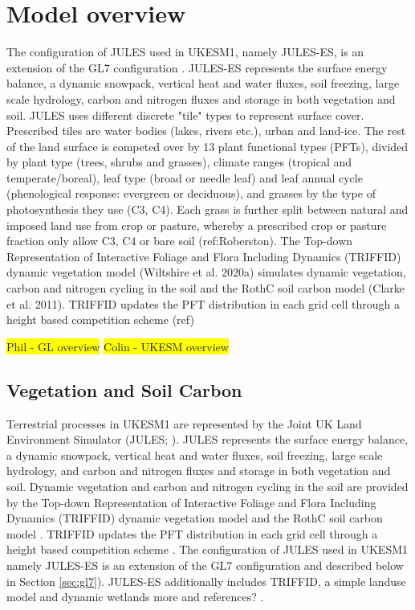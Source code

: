 \documentclass[bg, manuscript]{copernicus}
\newcommand{\hilight}[1]{\colorbox{yellow}{#1}}
\begin{document}
\section{Model overview}
The configuration of JULES used in UKESM1, namely JULES-ES, is an extension of the GL7 configuration \citep{wiltshire2020gl7}. JULES-ES represents the surface energy balance, a dynamic snowpack, vertical heat and water fluxes, soil freezing, large scale hydrology, carbon and nitrogen fluxes and storage in both vegetation and soil. JULES uses different discrete "tile" types to represent surface cover. Prescribed tiles are water bodies (lakes, rivers etc.), urban and land-ice. The rest of the land surface is competed over by 13 plant functional types (PFTs), divided by plant type (trees, shrubs and grasses), climate ranges (tropical and temperate/boreal), leaf type (broad or needle leaf) and leaf annual cycle (phenological response: evergreen or deciduous), and grasses by the type of photosynthesis they use (C3, C4). Each grass is further split between natural and imposed land use from crop or pasture, whereby a prescribed crop or pasture fraction only allow C3, C4 or bare soil (ref:Roberston). The Top-down Representation of Interactive Foliage and Flora Including Dynamics (TRIFFID) dynamic vegetation model (Wiltshire et al. 2020a) simulates dynamic vegetation,  carbon and nitrogen cycling in the soil and the RothC soil carbon model (Clarke et al. 2011). TRIFFID updates the PFT distribution in each grid cell through a height based competition scheme (ref)

\hilight{Phil - GL overview}
\hilight{Colin - UKESM overview}



\subsection{Vegetation and Soil Carbon}

Terrestrial processes in UKESM1 are represented by the Joint UK Land Environment Simulator (JULES; ). JULES represents the surface energy balance, a dynamic snowpack, vertical heat and water fluxes, soil freezing, large scale hydrology, and carbon and nitrogen fluxes and storage in both vegetation and soil. Dynamic vegetation and carbon and nitrogen cycling in the soil are provided by the Top-down Representation of Interactive Foliage and Flora Including Dynamics (TRIFFID) dynamic vegetation model \cite{wiltshire2020jules} and the RothC soil carbon model \cite{clark2011joint}. TRIFFID updates the PFT distribution in each grid cell through a height based competition scheme \citep{harper2016improved}. The configuration of JULES used in UKESM1 namely JULES-ES is an extension of the GL7 configuration \citep{wiltshire2020gl7} and described below in Section \ref{sec:gl7}). JULES-ES additionally includes TRIFFID, a simple landuse model and dynamic wetlands \color{red} more and references? \color{black}. 
 
\end{document}
